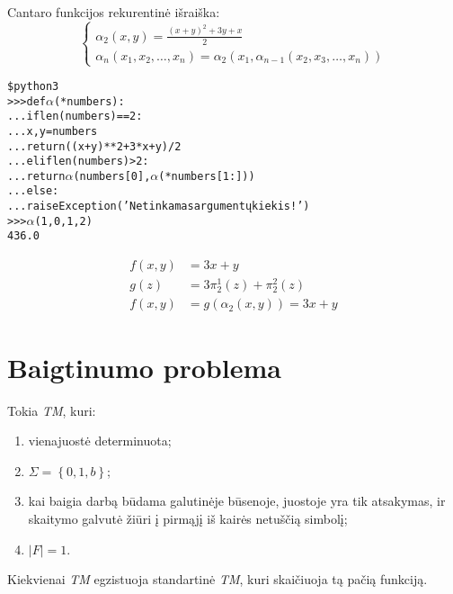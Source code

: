 Cantaro funkcijos rekurentinė išraiška:
\[
\begin{cases}
   \alpha _{2} (x,y) = \frac{(x+y)^{2} + 3y + x}{2} \\
   \alpha _{n} (x_1,x_2,\dotsc,x_n) =%
   \alpha _{2} (x_1, \alpha _{n-1} (x_2,x_3,\dotsc,x_n))
\end{cases}
\]

\begin{note}
  \begin{alltt}
\$ python3
>>> def \(\alpha\)(*numbers):
...   if len(numbers) == 2:
...     x, y = numbers
...     return ((x+y)**2 + 3*x + y)/2
...   elif len(numbers) > 2:
...     return \(\alpha\)(numbers[0], \(\alpha\)(*numbers[1:]))
...   else:
...     raise Exception('Netinkamas argumentų kiekis!')
>>> \(\alpha\)(1,0,1,2)
436.0
  \end{alltt}
\end{note}

\begin{exmp}
  \begin{align*}
    f(x,y) &= 3x + y \\
    g(z) &= 3 \pi^{1}_{2}(z) + \pi^{2}_{2}(z) \\
    f(x,y) &= g(\alpha_{2}(x,y)) = 3x + y
  \end{align*}
\end{exmp}

\section{Baigtinumo problema}

\begin{defn}
  Tokia \emph{TM}, kuri:
  \begin{enumerate}
    \item vienajuostė determinuota;
    \item $\Sigma = \left\{ 0, 1, b \right\}$;
    \item kai baigia darbą būdama galutinėje būsenoje, juostoje yra tik
      atsakymas, ir skaitymo galvutė žiūri į pirmąjį iš kairės netuščią
      simbolį;
    \item $|F| = 1$.
  \end{enumerate}
\end{defn}

\begin{prop}
  Kiekvienai \emph{TM} egzistuoja standartinė \emph{TM}, kuri skaičiuoja
  tą pačią funkciją.
\end{prop}

